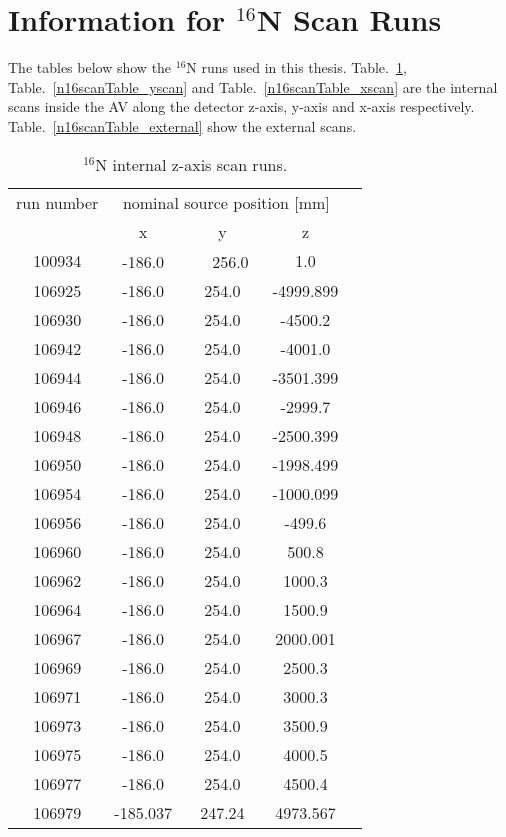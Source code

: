 \section{Information for $^{16}$N Scan Runs}
The tables below show the $^{16}$N runs used in this thesis. Table.~\ref{n16scanTable_zscan}, Table.~\ref{n16scanTable_yscan} and Table.~\ref{n16scanTable_xscan} are the internal scans inside the AV along the detector z-axis, y-axis and x-axis respectively. Table.~\ref{n16scanTable_external} show the external scans.
\begin{table}[ht]\label{n16scanTable_zscan}
		\caption[]{$^{16}$N internal z-axis scan runs.}
			\centering
	\begin{tabular*}{90mm}{c@{\extracolsep{\fill}}*4c}
		\toprule 
		run number  & \multicolumn{3}{c}{nominal source position [mm]}  \\
                                \cline{2-4}
			& x & y & z\\
		\midrule
        100934 &-186.0　&　256.0　& 1.0\\
        106925 &-186.0 &254.0  &-4999.899\\
        106930 &-186.0 & 254.0 & -4500.2\\
        106942 &-186.0 & 254.0 & -4001.0\\
        106944 &-186.0 & 254.0 & -3501.399\\
        106946 &-186.0 & 254.0 & -2999.7\\
        106948 &-186.0 & 254.0 & -2500.399\\
        106950 &-186.0 & 254.0 & -1998.499\\
        106954 &-186.0 & 254.0 & -1000.099\\
        106956 &-186.0 & 254.0 & -499.6\\
        106960 &-186.0 & 254.0 & 500.8\\
        106962 &-186.0 & 254.0 & 1000.3\\
        106964 &-186.0 & 254.0 & 1500.9\\
        106967 &-186.0 & 254.0 & 2000.001\\
        106969 &-186.0 & 254.0 & 2500.3\\
        106971 &-186.0 & 254.0 & 3000.3\\
        106973 &-186.0 & 254.0 & 3500.9\\
        106975 &-186.0 & 254.0 & 4000.5\\
        106977 &-186.0 & 254.0 & 4500.4\\
        106979 &-185.037 & 247.24 & 4973.567\\
        		\bottomrule	
	\end{tabular*}
\end{table}        
        
